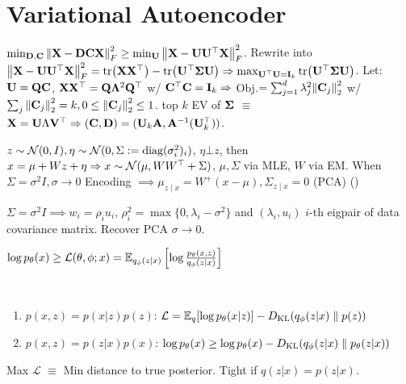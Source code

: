 \section{Variational Autoencoder}

\begin{definition}
    \(\min_{\DM, \CM} \norm{\X - \DM\CM\X}_F^2 \geq \min_{\U} \norm{\X - \U\U^\top \X}_F^2\).
    Rewrite into \(\norm{\X - \U\U^\top\X}_F^2 = \tr(\X\X^\top) - \tr(\U^\top \S \U) \implies \max_{\U^\top \U = \I_k} \tr(\U^\top \S \U)\).
    Let: \(\U = \vb Q \CM\), \(\X\X^\top = \vb Q \vb*{\Lambda}^2 \vb{Q}^\top\) w/ \(\CM^\top \CM = \I_k \implies\) Obj.\(= \sum_{j=1}^d \lambda_j^2 \norm{\CM_j}_2^2\) w/ \(\sum_j \norm{\CM_j}_2^2 = k, 0 \leq \norm{\CM_j}_2^2 \leq 1\). top \(k\) EV of \(\S\) \(\equiv\) \(\X = \U\Lambda \V^\top \implies (\CM, \DM) = (\U_k\A, \A^{-1}(\U_k^\top))\).
\end{definition}

\begin{definition}[LFA]
    \(z \sim \Normal(0, I), \eta \sim \Normal(0, \Sigma := \text{diag}(\sigma_i^2)_i)\), \(\eta \bot z\), then \(x = \mu + Wz + \eta \implies x \sim \Normal(\mu, WW^\top + \Sigma)\), \(\mu, \Sigma\) via MLE, \(W\) via EM. When \(\Sigma = \sigma^2 I, \sigma \to 0\) Encoding \(\implies \mu_{z \mid x} = W^+(x - \mu), \Sigma_{z \mid x} = 0\) (PCA) ()
\end{definition}

\begin{definition}
    \(\Sigma = \sigma^2 I \implies w_i = \rho_i u_i\), \(\rho_i^2 = \max\{0, \lambda_i - \sigma^2\}\) and \((\lambda_i, u_i)\) \(i\)-th eigpair of data covariance matrix. Recover PCA \(\sigma \to 0\).
\end{definition}

\begin{definition}[ELBO]
    \(\log p_\theta(x) \geq  \mathcal{L}(\theta, \phi; x) = \E_{q_\phi(z|x)}\left[\log \frac{p_\theta(x, z)}{q_\phi(z|x)}\right] \)
\end{definition}

\begin{lemma} \
    \begin{enumerate}
        \item \(p(x, z) = p(x|z)p(z)\):
        \( \mathcal{L} = \E_q[\log p_\theta(x|z)] - \DKL(q_\phi(z|x) \parallel p(z)) \)
        \item \(p(x, z) = p(z|x)p(x)\):
        \(\log p_\theta(x) \geq \log p_\theta(x) - \DKL(q_\phi(z|x) \parallel p_\theta(z|x)) \)
    \end{enumerate}
    Max \(\mathcal{L}\) \(\equiv\) Min distance to true posterior. Tight if \(q(z|x) = p(z|x)\).
\end{lemma}

